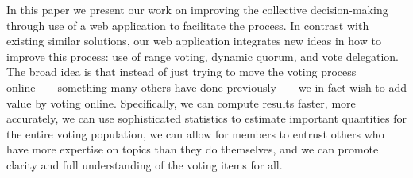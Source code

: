 \documentclass{sigchi}
\begin{document}
In this paper we present our work on improving the collective decision-making through use of a web application
to facilitate the process.
In contrast with existing similar solutions, our web application integrates new ideas in how to improve this process:
use of range voting, dynamic quorum, and vote delegation.
The broad idea is that instead of just trying to move the voting process online~---~something many others have done
previously~---~we in fact wish to add value by voting online.
Specifically, we can compute results faster, more accurately,
we can use sophisticated statistics to
estimate important quantities for the entire voting population, we can allow for members to entrust others who have
more expertise on topics than they do themselves, and we can promote clarity and full understanding of the voting
items for all.
\end{document}
